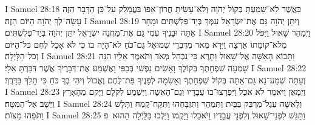 I Samuel 28:18	כַּאֲשֶׁר לֹא־שָׁמַעְתָּ בְּקוֹל יְהֹוָה וְלֹא־עָשִׂיתָ חֲרוֹן־אַפּוֹ בַּעֲמָלֵק עַל־כֵּן הַדָּבָר הַזֶּה עָשָׂה־לְךָ יְהֹוָה הַיּוֹם הַזֶּה׃
I Samuel 28:19	וְיִתֵּן יְהֹוָה גַּם אֶת־יִשְׂרָאֵל עִמְּךָ בְּיַד־פְּלִשְׁתִּים וּמָחָר אַתָּה וּבָנֶיךָ עִמִּי גַּם אֶת־מַחֲנֵה יִשְׂרָאֵל יִתֵּן יְהֹוָה בְּיַד־פְּלִשְׁתִּים׃
I Samuel 28:20	וַיְמַהֵר שָׁאוּל וַיִּפֹּל מְלֹא־קוֹמָתוֹ אַרְצָה וַיִּרָא מְאֹד מִדִּבְרֵי שְׁמוּאֵל גַּם־כֹּחַ לֹא־הָיָה בוֹ כִּי לֹא אָכַל לֶחֶם כּל־הַיּוֹם וְכל־הַלָּיְלָה׃
I Samuel 28:21	וַתָּבוֹא הָאִשָּׁה אֶל־שָׁאוּל וַתֵּרֶא כִּי־נִבְהַל מְאֹד וַתֹּאמֶר אֵלָיו הִנֵּה שָׁמְעָה שִׁפְחָתְךָ בְּקוֹלֶךָ וָאָשִׂים נַפְשִׁי בְּכַפִּי וָאֶשְׁמַע אֶת־דְּבָרֶיךָ אֲשֶׁר דִּבַּרְתָּ אֵלָי׃
I Samuel 28:22	וְעַתָּה שְׁמַע־נָא גַם־אַתָּה בְּקוֹל שִׁפְחָתֶךָ וְאָשִׂמָה לְפָנֶיךָ פַּת־לֶחֶם וֶאֱכוֹל וִיהִי בְךָ כֹּחַ כִּי תֵלֵךְ בַּדָּרֶךְ׃
I Samuel 28:23	וַיְמָאֵן וַיֹּאמֶר לֹא אֹכַל וַיִּפְרְצוּ־בוֹ עֲבָדָיו וְגַם־הָאִשָּׁה וַיִּשְׁמַע לְקֹלָם וַיָּקם מֵהָאָרֶץ וַיֵּשֶׁב אֶל־הַמִּטָּה׃
I Samuel 28:24	וְלָאִשָּׁה עֵגֶל־מַרְבֵּק בַּבַּיִת וַתְּמַהֵר וַתִּזְבָּחֵהוּ וַתִּקַּח־קֶמַח וַתָּלָשׁ וַתֹּפֵהוּ מַצּוֹת׃
I Samuel 28:25	וַתַּגֵּשׁ לִפְנֵי־שָׁאוּל וְלִפְנֵי עֲבָדָיו וַיֹּאכֵלוּ וַיָּקֻמוּ וַיֵּלְכוּ בַּלַּיְלָה הַהוּא׃ {פ}
